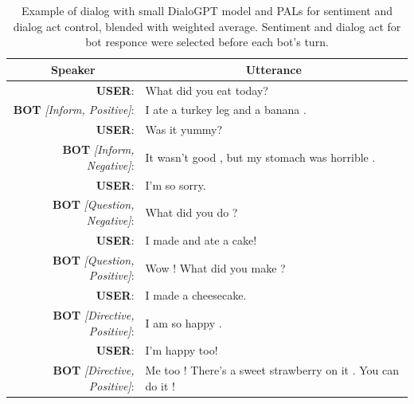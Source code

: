 \documentclass[11pt]{article}
\begin{document}
\begin{table}[]
\begin{tabular}{rl}
\multicolumn{1}{c}{Speaker}    & \multicolumn{1}{c}{Utterance}                               \\ \hline
\textbf{USER}:                          & What did you eat today?                                     \\
\textbf{BOT} \textit{{[}Inform, Positive{]}}:    & I ate a turkey leg and a banana .                           \\
\textbf{USER}:                          & Was it yummy?                                               \\
\textbf{BOT} \textit{{[}Inform, Negative{]}}:    & It wasn't good , but my stomach was horrible .              \\
\textbf{USER}:                          & I'm so sorry.                                               \\
\textbf{BOT} \textit{{[}Question, Negative{]}}:  & What did you do ?                                           \\
\textbf{USER}:                          & I made and ate a cake!                                      \\
\textbf{BOT} \textit{{[}Question, Positive{]}}:  & Wow ! What did you make ?                                   \\
\textbf{USER}:                          & I made a cheesecake.                                        \\
\textbf{BOT} \textit{{[}Directive, Positive{]}}: & I am so happy .                                             \\
\textbf{USER}:                          & I'm happy too!                                              \\
\textbf{BOT} \textit{{[}Directive, Positive{]}}: & Me too ! There's a sweet strawberry on it . You can do it !
\end{tabular}
\caption{Example of dialog with small DialoGPT model and PALs for sentiment and dialog act control, blended with weighted average. Sentiment and dialog act for bot responce were selected before each bot's turn.}
\label{tab:cake_example_dialog}
\end{table}
    
\end{document}
